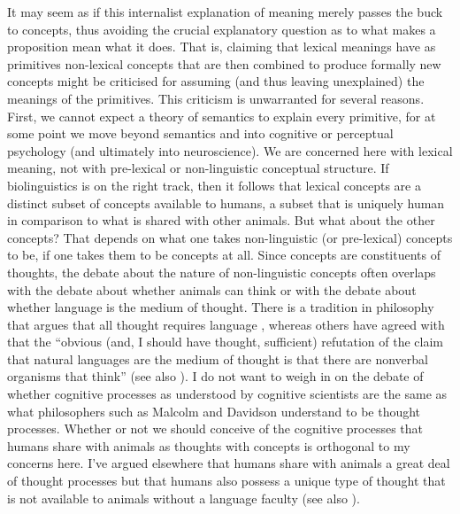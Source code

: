 It may seem as if this internalist explanation of meaning merely passes the buck to concepts, thus avoiding the crucial explanatory question as to what makes a proposition mean what it does. That is, claiming that lexical meanings have as primitives non-lexical concepts that are then combined to produce formally new concepts might be criticised for assuming (and thus leaving unexplained) the meanings of the primitives. This criticism is unwarranted for several reasons. First, we cannot expect a theory of semantics to explain every primitive, for at some point we move beyond semantics and into cognitive or perceptual psychology (and ultimately into neuroscience). We are concerned here with lexical meaning, not with pre-lexical or non-linguistic conceptual structure. If biolinguistics is on the right track, then it follows that lexical concepts are a distinct subset of concepts available to humans, a subset that is uniquely human in comparison to what is shared with other animals. But what about the other concepts? That depends on what one takes non-linguistic (or pre-lexical) concepts to be, if one takes them to be concepts at all. Since concepts are constituents of thoughts, the debate about the nature of non-linguistic concepts often overlaps with the debate about whether animals can think or with the debate about whether language is the medium of thought. There is a tradition in philosophy that argues that all thought requires language \citep{Malcolm1972,Davidson1975,Davidson1982,Dummett1989,McDowell1994}, whereas others have agreed with \citet[56]{Fodor1975} that the “obvious (and, I should have thought, sufficient) refutation of the claim that natural languages are the medium of thought is that there are nonverbal organisms that think” (see also \citealt{Ryle1968,Slezak2002,deWaal2016}). I do not want to weigh in on the debate of whether cognitive processes as understood by cognitive scientists are the same as what philosophers such as Malcolm and Davidson understand to be thought processes. Whether or not we should conceive of the cognitive processes that humans share with animals as thoughts with concepts is orthogonal to my concerns here. I’ve argued elsewhere that humans share with animals a great deal of thought processes but that humans also possess a unique type of thought that is not available to animals without a language faculty \citep{Asoulin2016,Asoulin2019} (see also \citealt{Gallistel1991,Gallistel2011}).
	
